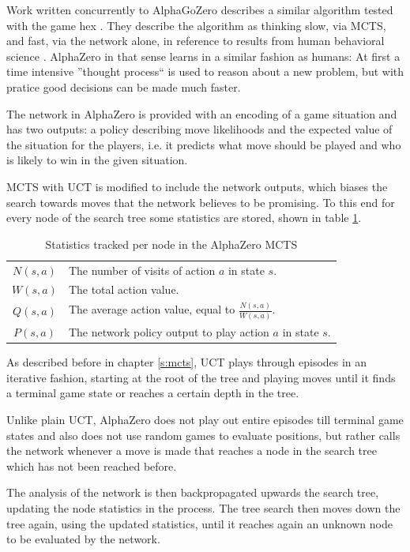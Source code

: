 \documentclass[12pt,onecolumn,oneside,titlepage]{article}
\begin{document}
Work written concurrently to AlphaGoZero describes a similar algorithm tested with the game hex \cite{anthony2017thinking}. They describe the algorithm as thinking slow, via MCTS, and fast, via the network alone, in reference to results from human behavioral science \cite{kahneman2011thinking}.
AlphaZero in that sense learns in a similar fashion as humans: At first a time intensive ''thought process`` is used to reason about a new problem, but with pratice good decisions can be made much faster.

The network in AlphaZero is provided with an encoding of a game situation and has two outputs: a policy describing move likelihoods and the expected value of the situation for the players, i.e. it predicts what move should be played and who is likely to win in the given situation.

MCTS with UCT is modified to include the network outputs, which biases the search towards moves that the network believes to be promising.
To this end for every node of the search tree some statistics are stored, shown in table \ref{t:mcts_stats_values}.

\begin{table} [H]
 \centering
  \begin{tabular}{ c l }
  $N(s,a)$ & The number of visits of action $a$ in state $s$. \\ 
  $W(s,a)$ & The total action value. \\  
  $Q(s, a)$ & The average action value, equal to $\frac{N(s,a)}{W(s,a)}$. \\
  $P(s,a)$ & The network policy output to play action $a$ in state $s$.
  \end{tabular}
  \caption{Statistics tracked per node in the AlphaZero MCTS}
  \label{t:mcts_stats_values}
\end{table}

As described before in chapter \ref{s:mcts}, UCT plays through episodes in an iterative fashion, starting at the root of the tree and playing moves until it finds a terminal game state or reaches a certain depth in the tree.

Unlike plain UCT, AlphaZero does not play out entire episodes till terminal game states and also does not use random games to evaluate positions, but rather calls the network whenever a move is made that reaches a node in the search tree which has not been reached before.

The analysis of the network is then backpropagated upwards the search tree, updating the node statistics in the process. The tree search then moves down the tree again, using the updated statistics, until it reaches again an unknown node to be evaluated by the network.
\end{document}
